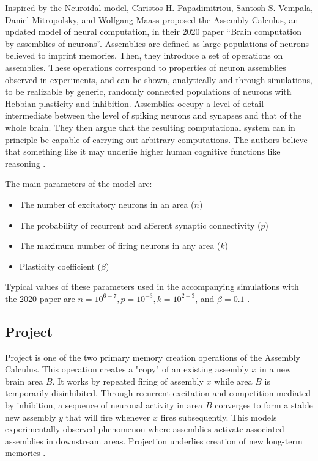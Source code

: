 Inspired by the Neuroidal model, Christos H. Papadimitriou, Santosh S. Vempala, Daniel Mitropolsky, and Wolfgang Maass proposed the Assembly Calculus, an updated model of neural computation, in their 2020 paper ``Brain computation by assemblies of neurons''. Assemblies are defined as large populations of neurons believed to imprint memories. Then, they introduce a set of operations on assemblies. These operations correspond to properties of neuron assemblies observed in experiments, and can be shown, analytically and through simulations, to be realizable by generic, randomly connected populations of neurons with Hebbian plasticity and inhibition. Assemblies occupy a level of detail intermediate between the level of spiking neurons and synapses and that of the whole brain. They then argue that the resulting computational system can in principle be capable of carrying out arbitrary computations. The authors believe that something like it may underlie higher human cognitive functions like reasoning \cite{papadimitriou2020brain}. 

The main parameters of the model are:
\begin{itemize}
    \item The number of excitatory neurons in an area ($n$) 
    \item The probability of recurrent and afferent synaptic connectivity ($p$)
    \item The maximum number of firing neurons in any area ($k$)
    \item Plasticity coefficient ($\beta$)
\end{itemize}

Typical values of these parameters used in the accompanying simulations with the 2020 paper are $n = 10^{6-7} , p = 10^{-3}, k = 10^{2-3}$, and $\beta = 0.1$ \cite{papadimitriou2020brain}.

\subsection{Project}

Project is one of the two primary memory creation operations of the Assembly Calculus. This operation creates a "copy" of an existing assembly $x$ in a new brain area $B$. It works by repeated firing of assembly $x$ while area $B$ is temporarily disinhibited. Through recurrent excitation and competition mediated by inhibition, a sequence of neuronal activity in area $B$ converges to form a stable new assembly $y$ that will fire whenever $x$ fires subsequently. This models experimentally observed phenomenon where assemblies activate associated assemblies in downstream areas. Projection underlies creation of new long-term memories \cite{papadimitriou2020brain}.

